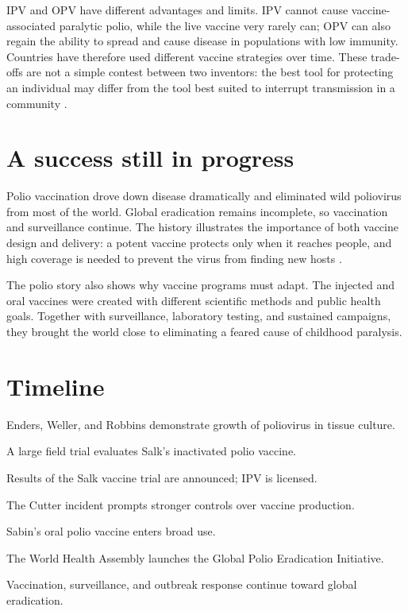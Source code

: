 \documentclass[12pt,oneside]{book}
\begin{document}
IPV and OPV have different advantages and limits. IPV cannot cause
vaccine-associated paralytic polio, while the live vaccine very rarely can;
OPV can also regain the ability to spread and cause disease in populations
with low immunity. Countries have therefore used different vaccine
strategies over time. These trade-offs are not a simple contest between two
inventors: the best tool for protecting an individual may differ from the
tool best suited to interrupt transmission in a community
\cite{cdcPolioChapter,whoPolioStatus}.

\section{A success still in progress}
Polio vaccination drove down disease dramatically and eliminated wild
poliovirus from most of the world. Global eradication remains incomplete,
so vaccination and surveillance continue. The history illustrates the
importance of both vaccine design and delivery: a potent vaccine protects
only when it reaches people, and high coverage is needed to prevent the
virus from finding new hosts \cite{whoPolioStatus}.

The polio story also shows why vaccine programs must adapt. The injected
and oral vaccines were created with different scientific methods and public
health goals. Together with surveillance, laboratory testing, and sustained
campaigns, they brought the world close to eliminating a feared cause of
childhood paralysis.

\section*{Timeline}
\begin{description}[leftmargin=2.3cm,style=nextline]
  \item[1949] Enders, Weller, and Robbins demonstrate growth of poliovirus in tissue culture.
  \item[1954] A large field trial evaluates Salk's inactivated polio vaccine.
  \item[12 April 1955] Results of the Salk vaccine trial are announced; IPV is licensed.
  \item[1955] The Cutter incident prompts stronger controls over vaccine production.
  \item[1961] Sabin's oral polio vaccine enters broad use.
  \item[1988] The World Health Assembly launches the Global Polio Eradication Initiative.
  \item[Today] Vaccination, surveillance, and outbreak response continue toward global eradication.
\end{description}
\end{document}
